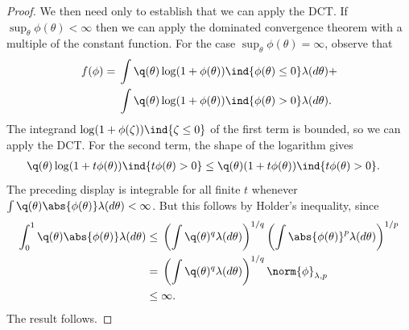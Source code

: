 \begin{lem}
\begin{proof}
We then need only to establish that we can apply the DCT. If $\sup_\theta
\phi(\theta) < \infty$ then we can apply the dominated convergence theorem with
a multiple of the constant function.  For the case $\sup_\theta \phi(\theta) =
\infty$, observe that
%
\begin{align*}
%
f(\phi) ={}&
    \int \q(\theta) \log(1 + \phi(\theta)) \ind{\phi(\theta) \le 0}
        \lambda(d\theta) + \\
    &\int \q(\theta) \log(1 + \phi(\theta)) \ind{\phi(\theta) > 0}
        \lambda(d\theta).
%
\end{align*}
%
The integrand $\log(1 + \phi(\zeta)) \ind{\zeta \le 0}$ of the first term
is bounded, so we can apply the DCT.  For the second term, the shape of
the logarithm gives
%
\begin{align*}
%
\q(\theta) \log(1 + t \phi(\theta)) \ind{t \phi(\theta) > 0}   \le{}&
    \q(\theta) (1 + t \phi(\theta)) \ind{t \phi(\theta) > 0}.%
\end{align*}
%
The preceding display is integrable for all finite $t$ whenever $\int \q(\theta)
\abs{\phi(\theta)} \lambda(d\theta) < \infty$. But this follows by Holder's
inequality, since
%
\begin{align*}
%
\int_0^1 \q(\theta) \abs{\phi(\theta)} \lambda(d \theta) \le{}&
    \left( \int \q(\theta)^q \lambda(d \theta) \right)^{1/q}
    \left( \int \abs{\phi(\theta)}^p \lambda(d \theta) \right)^{1/p}
\\={}&
    \left( \int \q(\theta)^q \lambda(d \theta) \right)^{1/q}
    \norm{\phi}_{\lambda,p}
\\\le{}&
    \infty.
%
\end{align*}
%
The result follows.
%
\end{proof}
%
\end{lem}



















